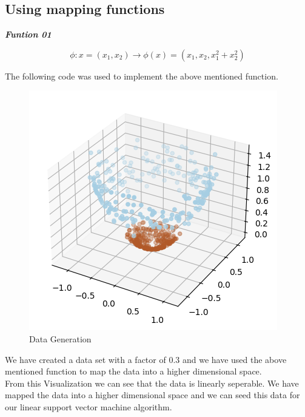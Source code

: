 \documentclass[11pt,a4paper]{article}
\begin{document}
\newpage
\subsection{Using mapping functions}

\textbf{\textit{Funtion 01}}

\begin{equation}
    \phi : x = (x_1,x_2) \rightarrow \phi{(x)} =  (x_1,x_2,x_1^2+x_2^2)
\end{equation}

The following code was used to implement the above mentioned function.

\lstset{style=mystyle}

    
    {\begin{figure}[h]
        \centering
        \includegraphics[width=1.0\linewidth]{images/2.png}
        \caption{Data Generation}
    \end{figure}}

We have created a data set with a factor of 0.3 and we have used the above mentioned function to map the data into a higher dimensional space.\\

From this Visualization we can see that the data is linearly seperable. We have mapped the data into a higher dimensional space and we can seed this data for our linear support vector machine algorithm.
\end{document}
